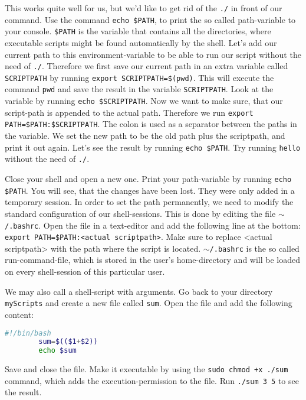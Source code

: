 \documentclass{dcbl/challenge}
\begin{document}
\begin{aufgabe}
    This works quite well for us, but we'd like to get rid of the \texttt{./} in front of our command. 
    Use the command \texttt{echo \$PATH}, to print the so called path-variable to your console.
    \texttt{\$PATH} is the variable that contains all the directories, where executable scripts might be found automatically by the shell.
    Let's add our current path to this environment-variable to be able to run our script without the need of \texttt{./}.
    Therefore we first save our current path in an extra variable called \texttt{SCRIPTPATH} by running \texttt{export SCRIPTPATH=\$(pwd)}. 
    This will execute the command \texttt{pwd} and save the result in the variable \texttt{SCRIPTPATH}.
    Look at the variable by running \texttt{echo \${SCRIPTPATH}}.
    Now we want to make sure, that our script-path is appended to the actual path.
    Therefore we run \texttt{export PATH=\$PATH:\$SCRIPTPATH}. 
    The colon is used as a separator between the paths in the variable.
    We set the new path to be the old path plus the scriptpath, and print it out again.
    Let's see the result by running \texttt{echo \$PATH}.
    Try running \texttt{hello} without the need of \texttt{./}.
\end{aufgabe}

\begin{aufgabe}
    Close your shell and open a new one.
    Print your path-variable by running \texttt{echo \$PATH}.
    You will see, that the changes have been lost. 
    They were only added in a temporary session. 
    In order to set the path permanently, we need to modify the standard configuration of our shell-sessions. 
    This is done by editing the file \texttt{$\sim$/.bashrc}.
    Open the file in a text-editor and add the following line at the bottom: \texttt{export PATH=\$PATH:<actual scriptpath>}.
    Make sure to replace <actual scriptpath> with the path where the script is located.
    \texttt{$\sim$/.bashrc} is the so called run-command-file, which is stored in the user's home-directory and will be loaded on every shell-session of this particular user.
\end{aufgabe}

\begin{aufgabe}
    We may also call a shell-script with arguments. 
    Go back to your directory \texttt{myScripts} and create a new file called \texttt{sum}.
    Open the file and add the following content:\\
    \begin{lstlisting}[language=bash, caption=Beispiel Shell-Script]
        #!/bin/bash
        sum=$(($1+$2))
        echo $sum
    \end{lstlisting}
    Save and close the file.
	Make it executable by using the \texttt{sudo chmod +x ./sum} command, which adds the execution-permission to the file.
    Run \texttt{./sum 3 5} to see the result.
\end{aufgabe}
\end{document}
